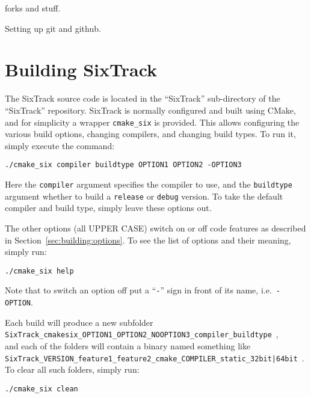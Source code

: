 \documentclass[english,BCOR=0mm,DIV=18]{scrartcl}
\begin{document}
forks and stuff.

Setting up git and github.


\section{Building SixTrack}
\label{sec:building}

The SixTrack source code is located in the ``SixTrack'' sub-directory of the ``SixTrack'' repository.
SixTrack is normally configured and built using CMake, and for simplicity a wrapper \texttt{cmake\_six} is provided.
This allows configuring the various build options, changing compilers, and changing build types.
To run it, simply execute the command:
\begin{lstlisting}
./cmake_six compiler buildtype OPTION1 OPTION2 -OPTION3
\end{lstlisting}
Here the \texttt{compiler} argument specifies the compiler to use, and the \texttt{buildtype} argument whether to build a \texttt{release} or \texttt{debug} version.
To take the default compiler and build type, simply leave these options out.

The other options (all UPPER CASE) switch on or off code features as described in Section~\ref{sec:building:options}.
To see the list of options and their meaning, simply run:
\begin{lstlisting}
./cmake_six help
\end{lstlisting}
Note that to switch an option off put a ``\texttt{-}'' sign in front of its name, i.e.\ \texttt{-OPTION}.

Each build will produce a new subfolder\\
\texttt{SixTrack\_\-cmakesix\_\-OPTION1\_\-OPTION2\_\-NOOPTION3\_\-compiler\_\-buildtype}~,\\
and each of the folders will contain a binary named something like\\
\texttt{SixTrack\_VERSION\_feature1\_feature2\_cmake\_COMPILER\_static\_{32bit|64bit}}~.\\
To clear all such folders, simply run:
\begin{lstlisting}
./cmake_six clean
\end{lstlisting}
\end{document}
